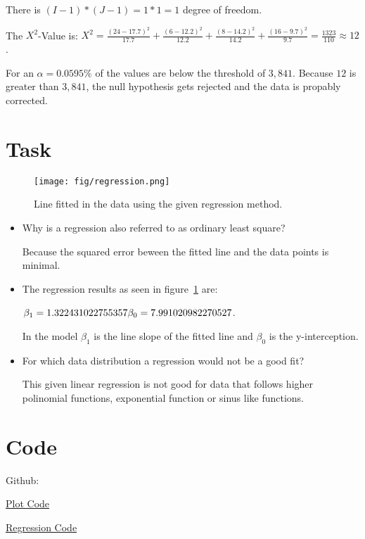 \documentclass[a4paper, 11pt]{article}
\begin{document}
There is $(I-1)*(J-1) = 1*1 = 1$ degree of freedom.

The $X^2$-Value is: $X^2 = \frac{(24-17.7)^2}{17.7} + \frac{(6-12.2)^2}{12.2} + \frac{(8-14.2)^2}{14.2} + \frac{(16-9.7)^2}{9.7} =\frac{1323}{110} \approx 12$.

For an $\alpha = 0.05  95\%$ of the values are below the threshold of $3,841$. Because $12$ is greater than $3,841$, the null hypothesis gets rejected and the data is propably corrected.
\newpage

\section{Task}

\begin{figure}[h!] 
    \centering
    \texttt{[image: fig/regression.png]}
    \caption{Line fitted in the data using the given regression method.}
    \label{fig:reg}
\end{figure}

\begin{itemize}
    \item Why is a regression also referred to as ordinary least square?
    
    Because the squared error beween the fitted line and the data points is minimal. 

    \item The regression results as seen in figure~\ref{fig:reg} are: 
    
    $\beta_1 = 1.322431022755357 \\ \beta_0 = 7.991020982270527$.

    In the model $\beta_1$ is the line slope of the fitted line and $\beta_0$ is the y-interception.

    \item For which data distribution a regression would not be a good fit?
    
    This given linear regression is not good for data that follows higher polinomial functions, exponential function or sinus like functions.

\end{itemize}

\newpage

\section{Code}

Github: 

\href{https://github.com/Flova/DAIS/blob/master/%C3%9Cbung%201/exercise1.py}{Plot Code}

\href{https://github.com/Flova/DAIS/blob/master/%C3%9Cbung%201/DAMI2_simpleRegression.py}{Regression Code}
\end{document}
